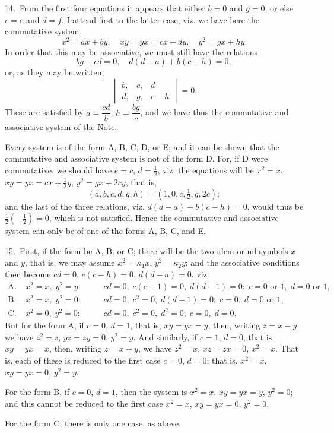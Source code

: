 \documentclass[11pt,a4paper]{article}
\theoremstyle{plain}
\theoremstyle{definition}
\theoremstyle{remark}
\begin{document}
14.~From the first four equations it appears that either $b=0$ and $g=0$, or else $c=e$ and $d=f$. I attend first to the latter case, viz. we have here the commutative system
\[
x^2=ax+by,\quad xy=yx=cx+dy,\quad y^2=gx+hy.
\]
In order that this may be associative, we must still have the relations
\[
bg-cd=0,\quad d(d-a)+b(c-h)=0,
\]
or, as they may be written,
\[
\begin{vmatrix} b, & c, & d \\ d, & g, & c-h \end{vmatrix} = 0.
\]
These are satisfied by $a=\dfrac{cd}{b}$, $h=\dfrac{bg}{c}$, and we have thus the commutative and associative system of the Note.

Every system is of the form A, B, C, D, or E; and it can be shown that the commutative and associative system is not of the form D. For, if D were commutative, we should have $e=c$, $d=\frac{1}{2}$, viz. the equations will be $x^2=x$, $xy=yx=cx+\frac{1}{2}y$, $y^2=gx+2cy$, that is,
\[
(a,b,c,d,g,h) = (1,0,c,\tfrac{1}{2},g,2c);
\]
and the last of the three relations, viz. $d(d-a)+b(c-h)=0$, would thus be $\frac{1}{2}(-\frac{1}{2})=0$, which is not satisfied. Hence the commutative and associative system can only be of one of the forms A, B, C, and E.

15.~First, if the form be A, B, or C; there will be the two idem-or-nil symbols $x$ and $y$, that is, we may assume $x^2=\kappa_1x$, $y^2=\kappa_2y$; and the associative conditions then become $cd=0$, $c(c-h)=0$, $d(d-a)=0$, viz.
\begin{align*}
\text{A.}\;& x^2=x,\; y^2=y:\quad && cd=0,\; c(c-1)=0,\; d(d-1)=0;\; c=0\text{ or }1,\; d=0\text{ or }1,\\
\text{B.}\;& x^2=x,\; y^2=0:\quad && cd=0,\; c^2=0,\; d(d-1)=0;\; c=0,\; d=0\text{ or }1,\\
\text{C.}\;& x^2=0,\; y^2=0:\quad && cd=0,\; c^2=0,\; d^2=0;\; c=0,\; d=0.
\end{align*}
But for the form A, if $c=0$, $d=1$, that is, $xy=yx=y$, then, writing $z=x-y$, we have $z^2=z$, $yz=zy=0$, $y^2=y$. And similarly, if $c=1$, $d=0$, that is, $xy=yx=x$, then, writing $z=x+y$, we have $z^2=x$, $xz=zx=0$, $x^2=x$. That is, each of these is reduced to the first case $c=0$, $d=0$; that is, $x^2=x$, $xy=yx=0$, $y^2=y$.

For the form B, if $c=0$, $d=1$, then the system is $x^2=x$, $xy=yx=y$, $y^2=0$; and this cannot be reduced to the first case $x^2=x$, $xy=yx=0$, $y^2=0$.

For the form C, there is only one case, as above.
\end{document}

